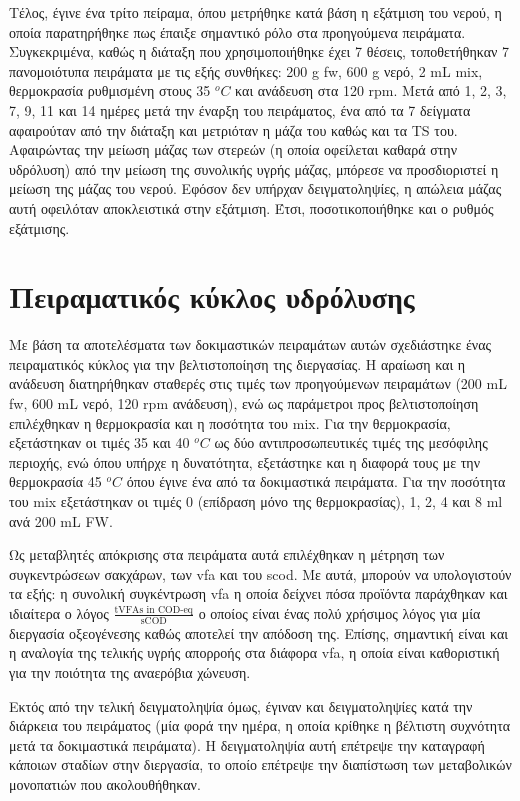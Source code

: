 \documentclass[11pt]{report}
\begin{document}
Τέλος, έγινε ένα τρίτο πείραμα, όπου μετρήθηκε κατά βάση η εξάτμιση του νερού, η οποία παρατηρήθηκε πως έπαιξε σημαντικό ρόλο στα προηγούμενα πειράματα. Συγκεκριμένα, καθώς η διάταξη που χρησιμοποιήθηκε έχει 7 θέσεις, τοποθετήθηκαν 7 πανομοιότυπα πειράματα με τις εξής συνθήκες: 200 g \acrshort{fw}, 600 g νερό, 2 mL \acrshort{mix}, θερμοκρασία ρυθμισμένη στους 35 \(^oC\) και ανάδευση στα 120 rpm. Μετά από 1, 2, 3, 7, 9, 11 και 14 ημέρες μετά την έναρξη του πειράματος, ένα από τα 7 δείγματα αφαιρούταν από την διάταξη και μετριόταν η μάζα του καθώς και τα TS του. Αφαιρώντας την μείωση μάζας των στερεών (η οποία οφείλεται καθαρά στην υδρόλυση) από την μείωση της συνολικής υγρής μάζας, μπόρεσε να προσδιοριστεί η μείωση της μάζας του νερού. Εφόσον δεν υπήρχαν δειγματοληψίες, η απώλεια μάζας αυτή οφειλόταν αποκλειστικά στην εξάτμιση. Έτσι, ποσοτικοποιήθηκε και ο ρυθμός εξάτμισης.

\section{Πειραματικός κύκλος υδρόλυσης}
\label{sec:orgc02de4a}
\label{sec:lab-hydro}
Με βάση τα αποτελέσματα των δοκιμαστικών πειραμάτων αυτών σχεδιάστηκε ένας πειραματικός κύκλος για την βελτιστοποίηση της διεργασίας. Η αραίωση και η ανάδευση διατηρήθηκαν σταθερές στις τιμές των προηγούμενων πειραμάτων (200 mL \acrshort{fw}, 600 mL νερό, 120 rpm ανάδευση), ενώ ως παράμετροι προς βελτιστοποίηση επιλέχθηκαν η θερμοκρασία και η ποσότητα του \acrshort{mix}. Για την θερμοκρασία, εξετάστηκαν οι τιμές 35 και 40 \(^oC\) ως δύο αντιπροσωπευτικές τιμές της μεσόφιλης περιοχής, ενώ όπου υπήρχε η δυνατότητα, εξετάστηκε και η διαφορά τους με την θερμοκρασία 45 \(^oC\) όπου έγινε ένα από τα δοκιμαστικά πειράματα. Για την ποσότητα του \acrshort{mix} εξετάστηκαν οι τιμές 0 (επίδραση μόνο της θερμοκρασίας), 1, 2, 4 και 8 ml ανά 200 mL FW. 

Ως μεταβλητές απόκρισης στα πειράματα αυτά επιλέχθηκαν η μέτρηση των συγκεντρώσεων σακχάρων, των \acrshort{vfa} και του \acrshort{scod}.  Με αυτά, μπορούν να υπολογιστούν τα εξής: η συνολική συγκέντρωση \acrshort{vfa} η οποία δείχνει πόσα προϊόντα παράχθηκαν και ιδιαίτερα ο λόγος \(\frac{\text{tVFAs in COD-eq}}{\text{sCOD}}\) ο οποίος είναι ένας πολύ χρήσιμος λόγος για μία διεργασία οξεογένεσης καθώς αποτελεί την απόδοση της. Επίσης, σημαντική είναι και η αναλογία της τελικής υγρής απορροής στα διάφορα \acrshort{vfa}, η οποία είναι καθοριστική για την ποιότητα της αναερόβια χώνευση.

Εκτός από την τελική δειγματοληψία όμως, έγιναν και δειγματοληψίες κατά την διάρκεια του πειράματος (μία φορά την ημέρα, η οποία κρίθηκε η βέλτιστη συχνότητα μετά τα δοκιμαστικά πειράματα). Η δειγματοληψία αυτή επέτρεψε την καταγραφή κάποιων σταδίων στην διεργασία, το οποίο επέτρεψε την διαπίστωση των μεταβολικών μονοπατιών που ακολουθήθηκαν.
\end{document}
